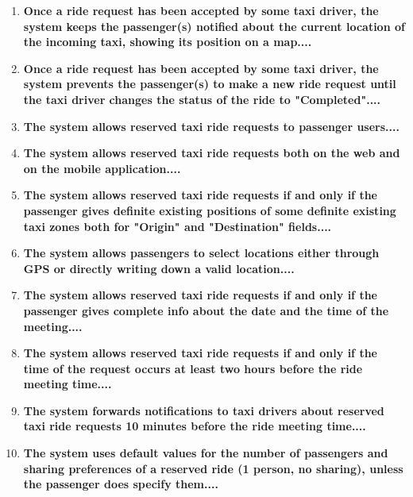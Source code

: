 \begin{enumerate}
	\item \textbf{Once a ride request has been accepted by some taxi driver, the system
			keeps the passenger(s) notified about the current location of the incoming
		taxi, showing its position on a map....}\\
	
	\item \textbf{Once a ride request has been accepted by some taxi driver, the system
		prevents the passenger(s) to make a new ride request until the taxi driver
		changes the status of the ride to "Completed"....}\\
	
	\item \textbf{The system allows reserved taxi ride requests to passenger users....}\\
	
	\item \textbf{The system allows reserved taxi ride requests both on the web and on the
		mobile application....}\\
	
	\item \textbf{The system allows reserved taxi ride requests if and only if the passenger
		gives definite existing positions of some definite existing taxi zones both
		for "Origin" and "Destination" fields....}\\
	
	\item \textbf{The system allows passengers to select locations either through GPS or
		directly writing down a valid location....}\\
	
	\item \textbf{The system allows reserved taxi ride requests if and only if the passenger
		gives complete info about the date and the time of the meeting....}\\
	
	\item \textbf{The system allows reserved taxi ride requests if and only if the time of the
		request occurs at least two hours before the ride meeting time....}\\
	
	\item \textbf{The system forwards notifications to taxi drivers about reserved taxi ride
		requests 10 minutes before the ride meeting time....}\\
	
	\item \textbf{The system uses default values for the number of passengers and sharing
		preferences of a reserved ride (1 person, no sharing), unless the passenger
		does specify them....}\\
	

\end{enumerate}
